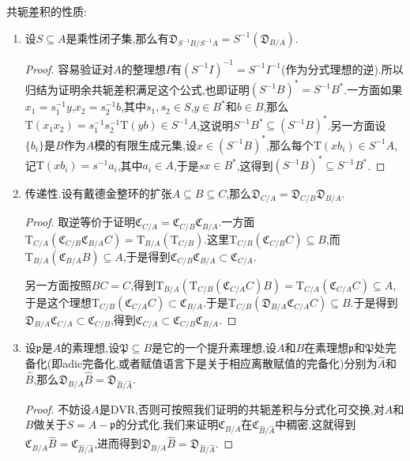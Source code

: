 共轭差积的性质:
\begin{enumerate}
	\item 设$S\subseteq A$是乘性闭子集,那么有$\mathfrak{D}_{S^{-1}B/S^{-1}A}=S^{-1}\left(\mathfrak{D}_{B/A}\right)$.
	\begin{proof}
		
		容易验证对$A$的整理想$I$有$(S^{-1}I)^{-1}=S^{-1}I^{-1}$(作为分式理想的逆).所以归结为证明余共轭差积满足这个公式,也即证明$(S^{-1}B)^*=S^{-1}B^*$.一方面如果$x_1=s_1^{-1}y$,$x_2=s_2^{-1}b$,其中$s_1,s_2\in S$,$y\in B^*$和$b\in B$,那么$\mathrm{T}(x_1x_2)=s_1^{-1}s_2^{-1}\mathrm{T}(yb)\in S^{-1}A$,这说明$S^{-1}B^*\subseteq(S^{-1}B)^*$.另一方面设$\{b_i\}$是$B$作为$A$模的有限生成元集,设$x\in(S^{-1}B)^*$,那么每个$\mathrm{T}(xb_i)\in S^{-1}A$,记$\mathrm{T}(xb_i)=s^{-1}a_i$,其中$a_i\in A$,于是$sx\in B^*$,这得到$(S^{-1}B)^*\subseteq S^{-1}B^*$.
	\end{proof}
	\item 传递性.设有戴德金整环的扩张$A\subseteq B\subseteq C$,那么$\mathfrak{D}_{C/A}=\mathfrak{D}_{C/B}\mathfrak{D}_{B/A}$.
	\begin{proof}
		
		取逆等价于证明$\mathfrak{C}_{C/A}=\mathfrak{C}_{C/B}\mathfrak{C}_{B/A}$.一方面$\mathrm{T}_{C/A}(\mathfrak{C}_{C/B}\mathfrak{C}_{B/A}C)=\mathrm{T}_{B/A}\left(\mathrm{T}_{C/B}\right)$.这里$\mathrm{T}_{C/B}(\mathfrak{C}_{C/B}C)\subseteq B$,而$\mathrm{T}_{B/A}(\mathfrak{C}_{B/A}B)\subseteq A$,于是得到$\mathfrak{C}_{C/B}\mathfrak{C}_{B/A}\subset\mathfrak{C}_{C/A}$.
		
		另一方面按照$BC=C$,得到$\mathrm{T}_{B/A}(\mathrm{T}_{C/B}(\mathfrak{C}_{C/A}C)B)=\mathrm{T}_{C/A}(\mathfrak{C}_{C/A}C)\subseteq A$,于是这个理想$\mathrm{T}_{C/B}(\mathfrak{C}_{C/A}C)\subset\mathfrak{C}_{B/A}$.于是$\mathrm{T}_{C/B}(\mathfrak{D}_{B/A}\mathfrak{C}_{C/A}C)\subseteq B$.于是得到$\mathfrak{D}_{B/A}\mathfrak{C}_{C/A}\subset\mathfrak{C}_{C/B}$,得到$\mathfrak{C}_{C/A}\subset\mathfrak{C}_{C/B}\mathfrak{C}_{B/A}$.
	\end{proof}
	\item 设$\mathfrak{p}$是$A$的素理想,设$\mathfrak{P}\subseteq B$是它的一个提升素理想,设$A$和$B$在素理想$\mathfrak{p}$和$\mathfrak{P}$处完备化(即adic完备化,或者赋值语言下是关于相应离散赋值的完备化)分别为$\widehat{A}$和$\widehat{B}$,那么$\mathfrak{D}_{B/A}\widehat{B}=\mathfrak{D}_{\widehat{B}/\widehat{A}}$.
	\begin{proof}
		
		不妨设$A$是DVR,否则可按照我们证明的共轭差积与分式化可交换,对$A$和$B$做关于$S=A-\mathfrak{p}$的分式化.我们来证明$\mathfrak{C}_{B/A}$在$\mathfrak{C}_{\widehat{B}/\widehat{A}}$中稠密,这就得到$\mathfrak{C}_{B/A}\widehat{B}=\mathfrak{C}_{\widehat{B}/\widehat{A}}$,进而得到$\mathfrak{D}_{B/A}\widehat{B}=\mathfrak{D}_{\widehat{B}/\widehat{A}}$.
		

\end{proof}
\end{enumerate}
